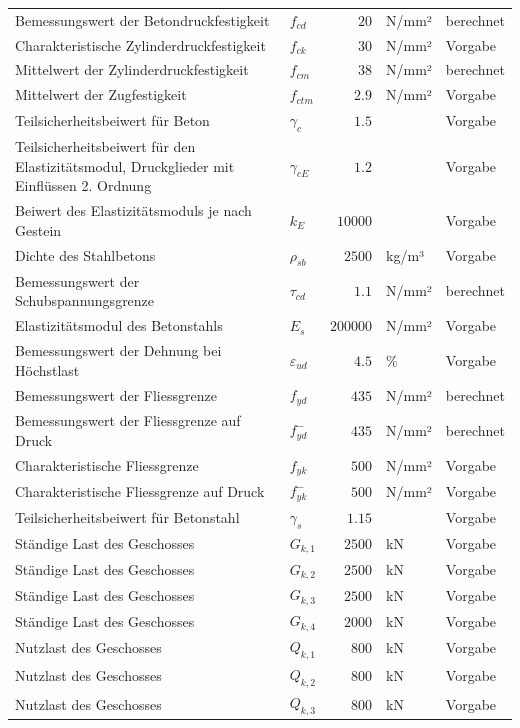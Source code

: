 \documentclass[11pt,a4paper]{article}
\begin{document}
\begin{xltabular}{\linewidth}{>{\raggedright\arraybackslash}Xlrll}
Bemessungswert der Betondruckfestigkeit & $f_{cd}$ & $20$ & N/mm² & berechnet \\
Charakteristische Zylinderdruckfestigkeit & $f_{ck}$ & $30$ & N/mm² & Vorgabe \\
Mittelwert der Zylinderdruckfestigkeit & $f_{cm}$ & $38$ & N/mm² & berechnet \\
Mittelwert der Zugfestigkeit & $f_{ctm}$ & $2.9$ & N/mm² & Vorgabe \\
Teilsicherheitsbeiwert für Beton & $\gamma_c$ & $1.5$ &  & Vorgabe \\
Teilsicherheitsbeiwert für den Elastizitätsmodul, Druckglieder mit Einflüssen 2. Ordnung & $\gamma_{cE}$ & $1.2$ &  & Vorgabe \\
Beiwert des Elastizitätsmoduls je nach Gestein & $k_E$ & $10000$ &  & Vorgabe \\
Dichte des Stahlbetons & $\rho_{sb}$ & $2500$ & kg/m³ & Vorgabe \\
Bemessungswert der Schubspannungsgrenze & $\tau_{cd}$ & $1.1$ & N/mm² & berechnet \\
Elastizitätsmodul des Betonstahls & $E_s$ & $200000$ & N/mm² & Vorgabe \\
Bemessungswert der Dehnung bei Höchstlast & $\varepsilon_{ud}$ & $4.5$ & \% & Vorgabe \\
Bemessungswert der Fliessgrenze & $f_{yd}$ & $435$ & N/mm² & berechnet \\
Bemessungswert der Fliessgrenze auf Druck & $f_{yd}^{-}$ & $435$ & N/mm² & berechnet \\
Charakteristische Fliessgrenze & $f_{yk}$ & $500$ & N/mm² & Vorgabe \\
Charakteristische Fliessgrenze auf Druck & $f_{yk}^{-}$ & $500$ & N/mm² & Vorgabe \\
Teilsicherheitsbeiwert für Betonstahl & $\gamma_s$ & $1.15$ &  & Vorgabe \\
Ständige Last des Geschosses & $G_{k,1}$ & $2500$ & kN & Vorgabe \\
Ständige Last des Geschosses & $G_{k,2}$ & $2500$ & kN & Vorgabe \\
Ständige Last des Geschosses & $G_{k,3}$ & $2500$ & kN & Vorgabe \\
Ständige Last des Geschosses & $G_{k,4}$ & $2000$ & kN & Vorgabe \\
Nutzlast des Geschosses & $Q_{k,1}$ & $800$ & kN & Vorgabe \\
Nutzlast des Geschosses & $Q_{k,2}$ & $800$ & kN & Vorgabe \\
Nutzlast des Geschosses & $Q_{k,3}$ & $800$ & kN & Vorgabe \\

\end{xltabular}
\end{document}
